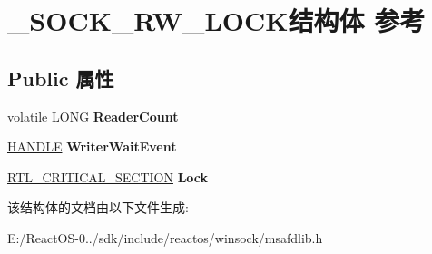 \hypertarget{struct___s_o_c_k___r_w___l_o_c_k}{}\section{\+\_\+\+S\+O\+C\+K\+\_\+\+R\+W\+\_\+\+L\+O\+C\+K结构体 参考}
\label{struct___s_o_c_k___r_w___l_o_c_k}
\subsection*{Public 属性}
\begin{DoxyCompactItemize}
\item 
\mbox{\label{struct___s_o_c_k___r_w___l_o_c_k_a8d2c1dfffe014b7fd541d7336cac81eb}} 
volatile L\+O\+NG {\bfseries Reader\+Count}
\item 
\mbox{\label{struct___s_o_c_k___r_w___l_o_c_k_a14ebfd200ace66bada5ed3cb00bfcf89}} 
\hyperlink{interfacevoid}{H\+A\+N\+D\+LE} {\bfseries Writer\+Wait\+Event}
\item 
\mbox{\label{struct___s_o_c_k___r_w___l_o_c_k_aa03f3811aa1adca4597f539475261fd7}} 
\hyperlink{struct___r_t_l___c_r_i_t_i_c_a_l___s_e_c_t_i_o_n}{R\+T\+L\+\_\+\+C\+R\+I\+T\+I\+C\+A\+L\+\_\+\+S\+E\+C\+T\+I\+ON} {\bfseries Lock}
\end{DoxyCompactItemize}


该结构体的文档由以下文件生成\+:\begin{DoxyCompactItemize}
\item 
E\+:/\+React\+O\+S-\/0../sdk/include/reactos/winsock/msafdlib.\+h\end{DoxyCompactItemize}
